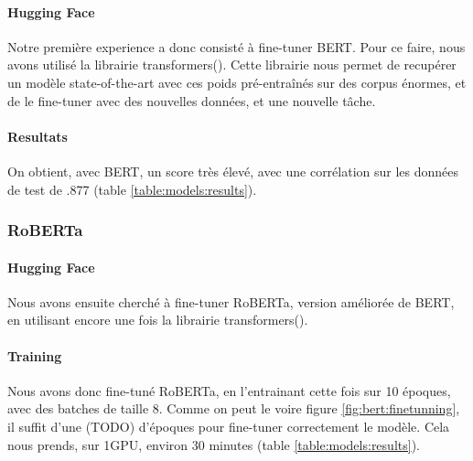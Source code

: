 \documentclass[11pt,a4paper, french]{article}
\begin{document}
\paragraph{Hugging Face} Notre première experience a donc consisté à fine-tuner BERT. Pour ce faire, nous avons utilisé la librairie transformers(\cite{huggingface}). Cette librairie nous permet de recupérer un modèle state-of-the-art avec ces poids pré-entraînés sur des corpus énormes, et de le fine-tuner avec des nouvelles données, et une nouvelle tâche.



\paragraph{Resultats} On obtient, avec BERT, un score très élevé, avec une corrélation sur les données de test de .877 (table \ref{table:models:results}).

%
\subsubsection{RoBERTa}

\paragraph{Hugging Face} Nous avons ensuite cherché à fine-tuner RoBERTa, version améliorée de BERT, en utilisant encore une fois la librairie transformers(\cite{huggingface}).

\paragraph{Training} Nous avons donc fine-tuné RoBERTa, en l'entrainant cette fois sur 10 époques, avec des batches de taille 8. Comme on peut le voire figure \ref{fig:bert:finetunning}, il suffit d'une (TODO) d'époques pour fine-tuner correctement le modèle. Cela nous prends, sur 1GPU, environ 30 minutes (table \ref{table:models:results}).
\end{document}
